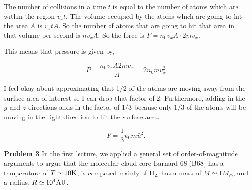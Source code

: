 \documentclass[12pt]{article}
\begin{document}
\begin{itemize}
The number of collisions in a time $t$ is equal to the number of atoms which are within the region $v_xt$. The volume occupied by the atoms which are going to hit the area $A$ is $v_xtA$. So the number of atoms that are going to hit that area in that volume per second is $nv_xA$. So the force is $F = n_0v_xA \cdot 2mv_x$.

This means that pressure is given by,

\begin{equation}
P = \frac{n_0v_xA2mv_x}{A} = 2n_0mv_x^2
\end{equation}

I feel okay about approximating that 1/2 of the atoms are moving away from the surface area of interest so I can drop that factor of 2. Furthermore, adding in the $y$ and $z$ directions adds in the factor of $1/3$ because only $1/3$ of the atoms will be moving in the right direction to hit the surface area.

\begin{equation}
P = \frac{1}{3}n_0m\bar u^2.
\end{equation}

\end{itemize}
 
\noindent \textbf{Problem 3} In the first lecture, we applied a general set of order-of-magnitude arguments to argue that the molecular cloud core Barnard 68 (B68) has a temperature of $T \sim 10{\rm K}$, is composed mainly of H$_2$, has a mass of $M \simeq 1 M_{\odot}$, and a radius, $R \simeq 10^4 {\rm AU}$.
\end{document}
